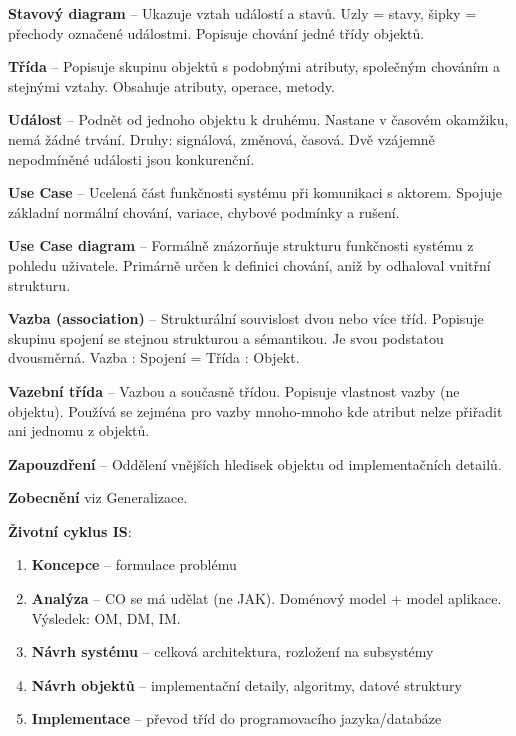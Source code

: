 \documentclass[12pt, a4paper]{article}
\begin{document}
\textbf{Stavový diagram} -- Ukazuje vztah událostí a stavů. Uzly = stavy, šipky = přechody označené událostmi. Popisuje chování jedné třídy objektů.

\textbf{Třída} -- Popisuje skupinu objektů s podobnými atributy, společným chováním a stejnými vztahy. Obsahuje atributy, operace, metody.

\textbf{Událost} -- Podnět od jednoho objektu k druhému. Nastane v časovém okamžiku, nemá žádné trvání. Druhy: signálová, změnová, časová. Dvě vzájemně nepodmíněné události jsou konkurenční.

\textbf{Use Case} -- Ucelená část funkčnosti systému při komunikaci s aktorem. Spojuje základní normální chování, variace, chybové podmínky a rušení.

\textbf{Use Case diagram} -- Formálně znázorňuje strukturu funkčnosti systému z pohledu uživatele. Primárně určen k definici chování, aniž by odhaloval vnitřní strukturu.

\textbf{Vazba (association)} -- Strukturální souvislost dvou nebo více tříd. Popisuje skupinu spojení se stejnou strukturou a sémantikou. Je svou podstatou dvousměrná. Vazba : Spojení = Třída : Objekt.

\textbf{Vazební třída} -- Vazbou a současně třídou. Popisuje vlastnost vazby (ne objektu). Používá se zejména pro vazby mnoho-mnoho kde atribut nelze přiřadit ani jednomu z objektů.

\textbf{Zapouzdření} -- Oddělení vnějších hledisek objektu od implementačních detailů.

\textbf{Zobecnění} viz Generalizace.

\textbf{Životní cyklus IS}:
\begin{enumerate}
  \item \textbf{Koncepce} -- formulace problému
  \item \textbf{Analýza} -- CO se má udělat (ne JAK). Doménový model + model aplikace. Výsledek: OM, DM, IM.
  \item \textbf{Návrh systému} -- celková architektura, rozložení na subsystémy
  \item \textbf{Návrh objektů} -- implementační detaily, algoritmy, datové struktury
  \item \textbf{Implementace} -- převod tříd do programovacího jazyka/databáze
\end{enumerate}
\end{document}

